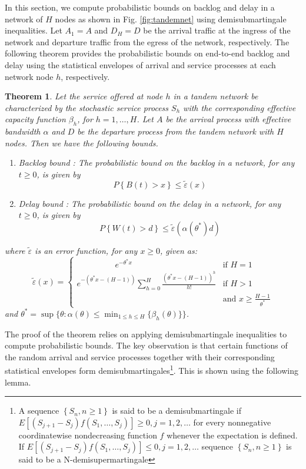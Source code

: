 \documentclass[letterpaper]{IEEEtran}
\newtheorem{theorem}{Theorem}[section]
\begin{document}
In this section, we compute probabilistic bounds on backlog and delay in a network of $H$ nodes as shown in Fig. \ref{fig:tandemnet} using demisubmartingale inequalities. Let $A_1 = A$ and $D_H = D$ be the arrival traffic at the ingress of the network and departure traffic from the egress of the network, respectively.  
The following theorem provides the probabilistic bounds on end-to-end backlog and delay using the statistical envelopes of arrival and service processes at each network node $h$, respectively. 
\begin{theorem}
\label{theorem:pbr}
Let the service offered at node $h$ in a tandem network be characterized by the stochastic service process $S_h$ with the corresponding effective capacity function $\beta_h$, for $h=1, \ldots, H$. Let $A$ be the arrival process with effective bandwidth $\alpha$ and $D$ be the departure process from the tandem network with $H$ nodes. Then we have the following bounds.
\begin{enumerate}
	\item Backlog bound : The probabilistic bound on the backlog in a network, for any $t \ge 0$, is given by
				\begin{equation}
					P\left\{B(t) > x \right\} \le \tilde{\varepsilon}(x) \label{backlog}
				\end{equation}	
	\item Delay bound : The probabilistic bound on the delay in a network, for any $t \ge 0$, is given by
				\begin{equation}
					P\left\{W(t) > d \right\} \le \tilde{\varepsilon}(\alpha(\theta^*)d) \label{delay}
				\end{equation}
\end{enumerate}
where  $\tilde{\varepsilon}$ is an error function, for any $x \ge 0$, given as: 
\small	
\begin{equation}
	\tilde{\varepsilon}(x)=
	\begin{cases}
				\ \ \ \ \ \ \ \ \ \ \ \ \ \ \ \ \ \ \ \ \ e^{-\theta^*x} & \text{if } H=1\\
				 e^{-(\theta^*x-(H-1))}\sum_{h=0}^{H}{\frac{(\theta^*x-(H-1))^h}{h!}} & \text{if } H>1\\
				 & \text{and }  x \ge \frac{H-1}{\theta^*}
				\end{cases} \label{errorfn}
\end{equation} and $\theta^* = \sup{\{\theta : \alpha(\theta) \le \min_{1 \le h \le H}{\{\beta_h(\theta)\}}\}}$.
\normalsize
\end{theorem}
The proof of the theorem relies on applying demisubmartingale inequalities to compute probabilistic bounds. The key observation is that certain functions of the random arrival and service processes together with their corresponding statistical envelopes form demisubmartingales\footnote{A  sequence $\left\{S_n, n\ge 1\right\}$ is said  to  be  a  demisubmartingale  if $E\left[(S_{j+1}-S_j)f(S_1, \ldots, S_j)\right] \ge 0, j=1,2,\ldots$  for  every nonnegative  coordinatewise  nondecreasing function $f$ whenever the expectation is defined. If $E\left[(S_{j+1}-S_j)f(S_1, \ldots, S_j)\right] \le 0, j=1,2,\ldots$ sequence $\left\{S_n, n\ge 1\right\}$ is said  to  be  a  N-demisupermartingale}. This is shown using the following lemma.
\end{document}
